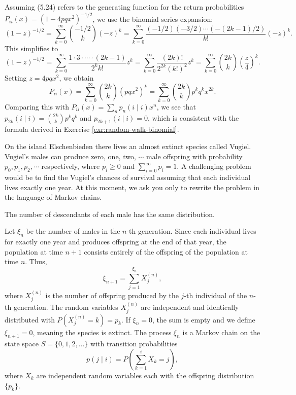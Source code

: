 \begin{Solution}
Assuming (5.24) refers to the generating function for the return probabilities $P_{ii}(x) = (1 - 4pqx^2)^{-1/2}$, we use the binomial series expansion:
\[
(1-z)^{-1/2} = \sum_{k=0}^\infty \binom{-1/2}{k} (-z)^k = \sum_{k=0}^\infty \frac{(-1/2)(-3/2)\cdots(-(2k-1)/2)}{k!} (-z)^k.
\]
This simplifies to
\[
(1-z)^{-1/2} = \sum_{k=0}^\infty \frac{1 \cdot 3 \cdot \cdots \cdot (2k-1)}{2^k k!} z^k = \sum_{k=0}^\infty \frac{(2k)!}{2^{2k} (k!)^2} z^k = \sum_{k=0}^\infty \binom{2k}{k} \left(\frac{z}{4}\right)^k.
\]
Setting $z = 4pqx^2$, we obtain
\[
P_{ii}(x) = \sum_{k=0}^\infty \binom{2k}{k} (pqx^2)^k = \sum_{k=0}^\infty \binom{2k}{k} p^k q^k x^{2k}.
\]
Comparing this with $P_{ii}(x) = \sum_n p_n(i \mid i) x^n$, we see that $p_{2k}(i \mid i) = \binom{2k}{k} p^k q^k$ and $p_{2k+1}(i \mid i) = 0$, which is consistent with the formula derived in Exercise \ref{exr:random-walk-binomial}.
\end{Solution}

\begin{Exercise}
\label{exr:branching-process}
On the island Elschenbieden there lives an almost extinct species called Vugiel. Vugiel's males can produce zero, one, two, $\cdots$ male offspring with probability $p_0, p_1, p_2, \cdots$ respectively, where $p_i \geq 0$ and $\sum_{i=0}^\infty p_i = 1$. A challenging problem would be to find the Vugiel's chances of survival assuming that each individual lives exactly one year. At this moment, we ask you only to rewrite the problem in the language of Markov chains.

\begin{hint}
The number of descendants of each male has the same distribution.
\end{hint}
\end{Exercise}

\begin{Solution}
Let $\xi_n$ be the number of males in the $n$-th generation. Since each individual lives for exactly one year and produces offspring at the end of that year, the population at time $n+1$ consists entirely of the offspring of the population at time $n$. Thus,
\[
\xi_{n+1} = \sum_{j=1}^{\xi_n} X_j^{(n)},
\]
where $X_j^{(n)}$ is the number of offspring produced by the $j$-th individual of the $n$-th generation. The random variables $X_j^{(n)}$ are independent and identically distributed with $P(X_j^{(n)} = k) = p_k$. If $\xi_n = 0$, the sum is empty and we define $\xi_{n+1} = 0$, meaning the species is extinct. The process $\xi_n$ is a Markov chain on the state space $S = \{0, 1, 2, \dots\}$ with transition probabilities
\[
p(j \mid i) = P\left( \sum_{k=1}^i X_k = j \right),
\]
where $X_k$ are independent random variables each with the offspring distribution $\{p_k\}$.
\end{Solution}

